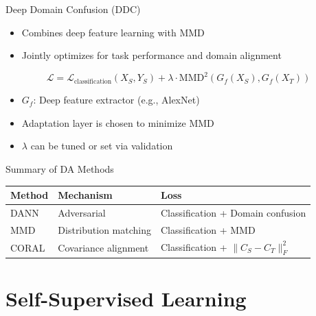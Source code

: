 \documentclass[11pt]{beamer}
\begin{document}
\begin{frame}{Deep Domain Confusion (DDC)}
    \begin{itemize}
        \item Combines deep feature learning with MMD
        \item Jointly optimizes for task performance and domain alignment
    \end{itemize}
    \[
        \mathcal{L} = \mathcal{L}_{\text{classification}}(X_S, Y_S) + \lambda \cdot \text{MMD}^2(G_f(X_S), G_f(X_T))
    \]
    \begin{itemize}
        \item $G_f$: Deep feature extractor (e.g., AlexNet)
        \item Adaptation layer is chosen to minimize MMD
        \item $\lambda$ can be tuned or set via validation
    \end{itemize}
    \vfill
    \begin{block}{Summary of DA Methods}
        \centering
        \begin{tabular}{lll}
            \toprule
            Method & Mechanism & Loss \\
            \midrule
            DANN & Adversarial & Classification + Domain confusion \\
            MMD & Distribution matching & Classification + MMD \\
            CORAL & Covariance alignment & Classification + $\|C_S - C_T\|_F^2$ \\
            \bottomrule
        \end{tabular}
    \end{block}
\end{frame}

\section{Self-Supervised Learning}
\end{document}
